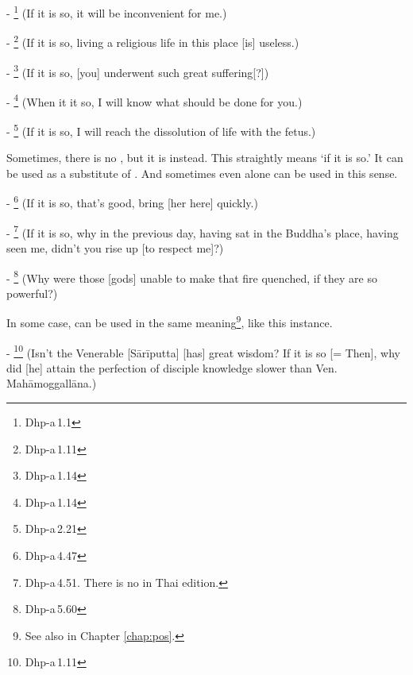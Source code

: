 - \footnote{Dhp-a\,1.1} (If it is so, it will be inconvenient for me.)\par
- \footnote{Dhp-a\,1.11} (If it is so, living a religious life in this place [is] useless.)\par
- \footnote{Dhp-a\,1.14} (If it is so, [you] underwent such great suffering[?])\par
- \footnote{Dhp-a\,1.14} (When it it so, I will know what should be done for you.)\par
- \footnote{Dhp-a\,2.21} (If it is so, I will reach the dissolution of life with the fetus.)\par

\medskip
Sometimes, there is no , but it is  instead. This straightly means `if it is so.' It can be used as a substitute of . And sometimes even  alone can be used in this sense.\par
- \footnote{Dhp-a\,4.47} (If it is so, that's good, bring [her here] quickly.)\par
- \footnote{Dhp-a\,4.51. There is no  in Thai edition.} (If it is so, why in the previous day, having sat in the Buddha's place, having seen me, didn't you rise up [to respect me]?)\par
- \footnote{Dhp-a\,5.60} (Why were those [gods] unable to make that fire quenched, if they are so powerful?)\par

\medskip
In some case,  can be used in the same meaning\footnote{See also  in Chapter \ref{chap:pos}.}, like this instance.\par
- \footnote{Dhp-a\,1.11} (Isn't the Venerable [S\=ar\=iputta] [has] great wisdom? If it is so [= Then], why did [he] attain the perfection of disciple knowledge slower than Ven.\,Mah\=a\-moggall\=ana.)\par
